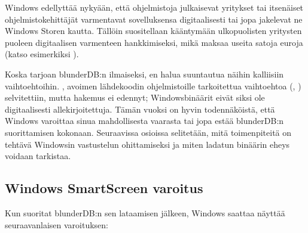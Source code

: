 \documentclass[letterpaper,10pt,finnish]{sphinxmanual}
\begin{document}
\sphinxAtStartPar
Windows edellyttää nykyään, että ohjelmistoja julkaisevat yritykset tai itsenäiset ohjelmistokehittäjät varmentavat sovelluksensa digitaalisesti tai jopa jakelevat ne Windows Storen kautta. Tällöin suositellaan kääntymään ulkopuolisten yritysten puoleen digitaalisen varmenteen hankkimiseksi, mikä maksaa useita satoja euroja (katso esimerkiksi  ).

\sphinxAtStartPar
Koska tarjoan blunderDB:n ilmaiseksi, en halua suuntautua näihin kalliisiin vaihtoehtoihin. , avoimen lähdekoodin ohjelmistoille tarkoitettua vaihtoehtoa (, ) selvitettiin, mutta hakemus ei edennyt; Windows\sphinxhyphen{}binäärit eivät siksi ole digitaalisesti allekirjoitettuja. Tämän vuoksi on hyvin todennäköistä, että Windows varoittaa sinua mahdollisesta vaarasta tai jopa estää blunderDB:n suorittamisen kokonaan. Seuraavissa osioissa selitetään, mitä toimenpiteitä on tehtävä Windowsin vastustelun ohittamiseksi ja miten ladatun binäärin eheys voidaan tarkistaa.


\subsection{Windows SmartScreen \sphinxhyphen{}varoitus}
\label{\detokenize{annexe_windows_securite:avertissement-windows-smartscreen}}
\sphinxAtStartPar
Kun suoritat blunderDB:n sen lataamisen jälkeen, Windows saattaa näyttää seuraavanlaisen varoituksen:

\begin{figure}[htbp]
\centering

\noindent{}
\end{figure}
\end{document}
